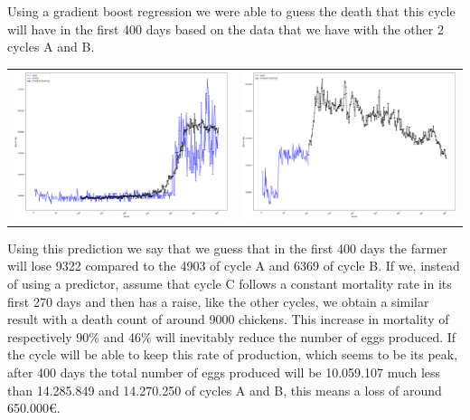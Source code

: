 \documentclass[11pt]{article}
\begin{document}
Using a gradient boost regression we were able to guess the death that this cycle will have in the first 400 days based on the data that we have with the other 2 cycles A and B.
\newline
\begin{tabular}{c c}
    \includegraphics[width=70mm]{../Results/Comp_AB_C/predictor.png} &
    \includegraphics[width=70mm]{../Results/Comp_AB_C/predicted.png}
\end{tabular}

Using this prediction we say that we guess that in the first 400 days the farmer will lose 9322 compared to the 4903 of cycle A and 6369 of cycle B.
If we, instead of using a predictor, assume that cycle C follows a constant mortality rate in its first 270 days and then has a raise, like the other cycles, we obtain a similar result with a death count of around 9000 chickens. 
This increase in mortality of respectively 90\% and 46\% will inevitably reduce the number of eggs produced.
If the cycle will be able to keep this rate of production, which seems to be its peak, after 400 days the total number of eggs produced will be 10.059.107 much less than 14.285.849 and 14.270.250 of cycles A and B, this means a loss of around 650.000\euro.
\end{document}
